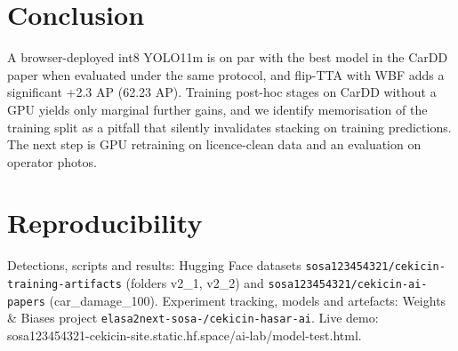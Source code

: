 \documentclass[10pt,twocolumn]{article}
\begin{document}
\section{Conclusion}
A browser-deployed int8 YOLO11m is on par with the best model in the CarDD paper when evaluated under the same protocol, and flip-TTA with WBF adds a significant +2.3 AP (62.23 AP). Training post-hoc stages on CarDD without a GPU yields only marginal further gains, and we identify memorisation of the training split as a pitfall that silently invalidates stacking on training predictions. The next step is GPU retraining on licence-clean data and an evaluation on operator photos.

\section*{Reproducibility}
Detections, scripts and results: Hugging Face datasets \texttt{sosa123454321/cekicin-training-artifacts} (folders v2\_1, v2\_2) and \texttt{sosa123454321/cekicin-ai-papers} (car\_damage\_100). Experiment tracking, models and artefacts: Weights \& Biases project \texttt{elasa2next-sosa-/cekicin-hasar-ai}. Live demo: sosa123454321-cekicin-site.static.hf.space/ai-lab/model-test.html.



\end{document}
